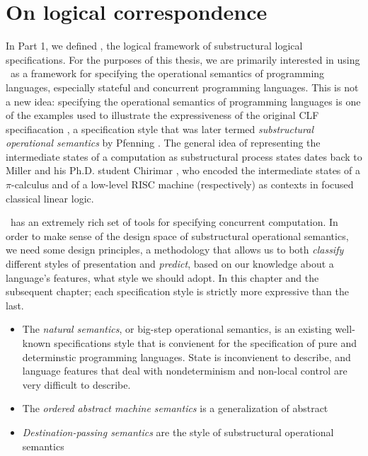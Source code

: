 \chapter{On logical correspondence}

In Part 1, we defined \sls, the logical framework of substructural
logical specifications. For the purposes of this thesis, we are
primarily interested in using \sls~as a framework for specifying the
operational semantics of programming languages, especially stateful
and concurrent programming languages. This is not a new idea:
specifying the operational semantics of programming languages is one
of the examples used to illustrate the expressiveness of the original
CLF specifiacation \cite{cervesato02concurrent}, a specification style
that was later termed {\it substructural operational semantics} by
Pfenning \cite{pfenning04substructural}. The general idea of
representing the intermediate states of a computation as substructural
process states dates back to Miller \cite{miller92pi} and his
Ph.D. student Chirimar \cite{chirimar95proof}, who encoded the
intermediate states of a $\pi$-calculus and of a low-level RISC
machine (respectively) as contexts in focused classical linear logic.

\sls~has an extremely rich set of tools for specifying concurrent
computation. In order to make sense of the design space of
substructural operational semantics, we need some design principles, a
methodology that allows us to both {\it classify} different styles of
presentation and {\it predict}, based on our knowledge about a
language's features, what style we should adopt. In this chapter and
the subsequent chapter; each specification style is strictly more
expressive than the last.

\begin{itemize}
\item The {\it natural semantics}, or big-step operational semantics, is
  an existing well-known specifications style that is convienent for
  the specification of pure and determinstic programming languages.
  State is inconvienent to describe, and language features that deal
  with nondeterminism and non-local control are very difficult to
  describe.

\item The {\it ordered abstract machine semantics} is a generalization of
  abstract 

\item {\it Destination-passing semantics} are the style of
  substructural operational semantics
\end{itemize}

